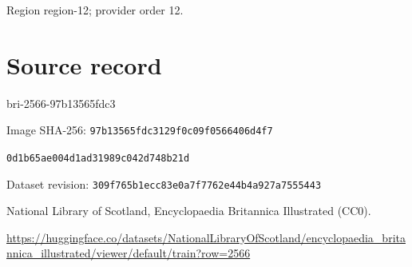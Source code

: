 \documentclass[11pt]{article}
\begin{document}
{\scriptsize\color{gray} Region region-12; provider order 12.\par}
\medskip
\newpage\section*{Source record}
bri-2566-97b13565fdc3\par
Image SHA-256: \texttt{97b13565fdc3129f0c09f0566406d4f7}\par\texttt{0d1b65ae004d1ad31989c042d748b21d}\par
Dataset revision: \texttt{309f765b1ecc83e0a7f7}\texttt{762e44b4a927a7555443}\par
National Library of Scotland, Encyclopaedia Britannica Illustrated (CC0).\par
\url{https://huggingface.co/datasets/NationalLibraryOfScotland/encyclopaedia_britannica_illustrated/viewer/default/train?row=2566}
\end{document}
